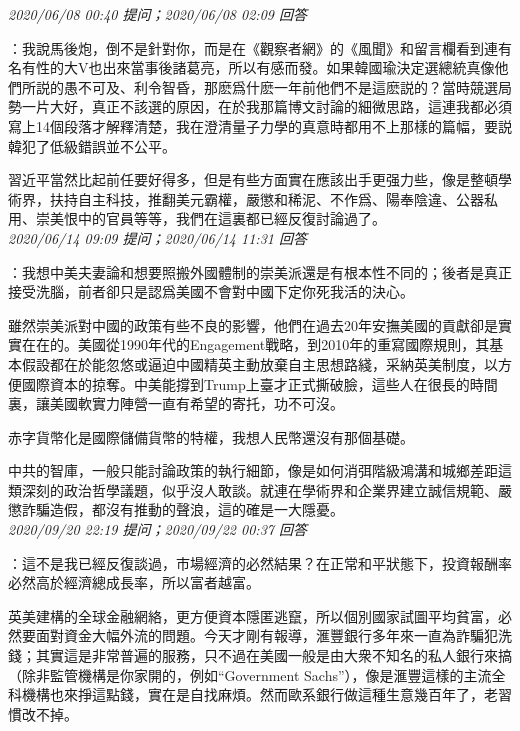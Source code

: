 \documentclass[twocolumn]{ctexart}
\begin{document}
\textit{\hfill\noindent\small 2020/06/08 00:40 提问；2020/06/08 02:09 回答}

：我說馬後炮，倒不是針對你，而是在《觀察者網》的《風聞》和留言欄看到連有名有性的大V也出來當事後諸葛亮，所以有感而發。如果韓國瑜決定選總統真像他們所説的愚不可及、利令智昏，那麽爲什麽一年前他們不是這麽説的？當時競選局勢一片大好，真正不該選的原因，在於我那篇博文討論的細微思路，這連我都必須寫上14個段落才解釋清楚，我在澄清量子力學的真意時都用不上那樣的篇幅，要説韓犯了低級錯誤並不公平。

習近平當然比起前任要好得多，但是有些方面實在應該出手更强力些，像是整頓學術界，扶持自主科技，推翻美元霸權，嚴懲和稀泥、不作爲、陽奉陰違、公器私用、崇美恨中的官員等等，我們在這裏都已經反復討論過了。
\\

\textit{\hfill\noindent\small 2020/06/14 09:09 提问；2020/06/14 11:31 回答}

：我想中美夫妻論和想要照搬外國體制的崇美派還是有根本性不同的；後者是真正接受洗腦，前者卻只是認爲美國不會對中國下定你死我活的決心。

雖然崇美派對中國的政策有些不良的影響，他們在過去20年安撫美國的貢獻卻是實實在在的。美國從1990年代的Engagement戰略，到2010年的重寫國際規則，其基本假設都在於能忽悠或逼迫中國精英主動放棄自主思想路綫，采納英美制度，以方便國際資本的掠奪。中美能撐到Trump上臺才正式撕破臉，這些人在很長的時間裏，讓美國軟實力陣營一直有希望的寄托，功不可沒。

赤字貨幣化是國際儲備貨幣的特權，我想人民幣還沒有那個基礎。

中共的智庫，一般只能討論政策的執行細節，像是如何消弭階級鴻溝和城鄉差距這類深刻的政治哲學議題，似乎沒人敢談。就連在學術界和企業界建立誠信規範、嚴懲詐騙造假，都沒有推動的聲浪，這的確是一大隱憂。
\\

\textit{\hfill\noindent\small 2020/09/20 22:19 提问；2020/09/22 00:37 回答}

：這不是我已經反復談過，市場經濟的必然結果？在正常和平狀態下，投資報酬率必然高於經濟總成長率，所以富者越富。

英美建構的全球金融網絡，更方便資本隱匿逃竄，所以個別國家試圖平均貧富，必然要面對資金大幅外流的問題。今天才剛有報導，滙豐銀行多年來一直為詐騙犯洗錢；其實這是非常普遍的服務，只不過在美國一般是由大衆不知名的私人銀行來搞（除非監管機構是你家開的，例如“Government Sachs”），像是滙豐這樣的主流全科機構也來掙這點錢，實在是自找麻煩。然而歐系銀行做這種生意幾百年了，老習慣改不掉。
\\
\end{document}
